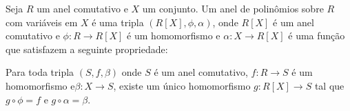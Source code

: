 \begin{definition}\label{definition:polinomio_propUniversal}
    Seja $R$ um anel comutativo e $X$ um conjunto.
    Um anel de polinômios sobre $R$ com variáveis em $X$ é uma tripla $(R[X], \phi, \alpha)$, onde $R[X]$ é um anel comutativo e $\phi:R\rightarrow R[X]$ é um homomorfismo e $\alpha:X\rightarrow R[X]$ é uma função que satisfazem a seguinte propriedade:

    Para toda tripla $(S, f, \beta)$ onde $S$ é um anel comutativo, $f:R\rightarrow S$ é um homomorfismo e$\beta:X\rightarrow S$, existe um único homomorfismo $g:R[X]\rightarrow S$ tal que $g\circ \phi=f$ e $g\circ \alpha=\beta$.
    \begin{figure}[H]
        \centering
    \end{figure}
\end{definition}

